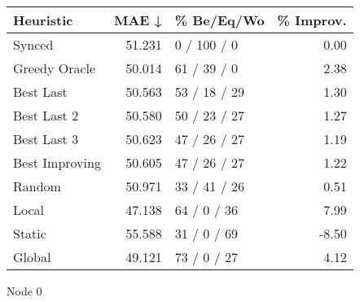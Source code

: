 \begin{tabular}{lrlr}
\toprule
\textbf{Heuristic} & \textbf{MAE ↓} & \textbf{\% Be/Eq/Wo} & \textbf{\% Improv.} \\
\midrule
            Synced &         51.231 &          0 / 100 / 0 &                0.00 \\
     Greedy Oracle &         50.014 &          61 / 39 / 0 &                2.38 \\
         Best Last &         50.563 &         53 / 18 / 29 &                1.30 \\
       Best Last 2 &         50.580 &         50 / 23 / 27 &                1.27 \\
       Best Last 3 &         50.623 &         47 / 26 / 27 &                1.19 \\
    Best Improving &         50.605 &         47 / 26 / 27 &                1.22 \\
            Random &         50.971 &         33 / 41 / 26 &                0.51 \\
             Local &         47.138 &          64 / 0 / 36 &                7.99 \\
            Static &         55.588 &          31 / 0 / 69 &               -8.50 \\
            Global &         49.121 &          73 / 0 / 27 &                4.12 \\
\bottomrule
\end{tabular}
\caption{Node 0}
\label{tab:non_lr05_le1_bs4_0}
